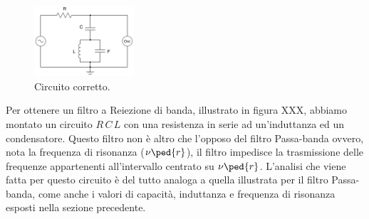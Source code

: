 \begin{figure}
  \includegraphics[width=0.33\textwidth]{s_corr.pdf}
  \caption{Circuito corretto.}
  \label{fig:corr}
\end{figure}

Per ottenere un filtro a Reiezione di banda, illustrato in figura XXX, abbiamo montato un circuito $R\,C\,L$ con una resistenza in serie ad un'induttanza ed un condensatore.
Questo filtro non è altro che l'opposo del filtro Passa-banda ovvero, nota la frequenza di risonanza ($\nu\ped{r}$), il filtro impedisce la trasmissione delle frequenze appartenenti all'intervallo centrato su $\nu\ped{r}$. L'analisi che viene fatta per questo circuito è del tutto analoga a quella illustrata per il filtro Passa-banda, come anche i valori di capacità, induttanza e frequenza di risonanza esposti nella sezione precedente.

